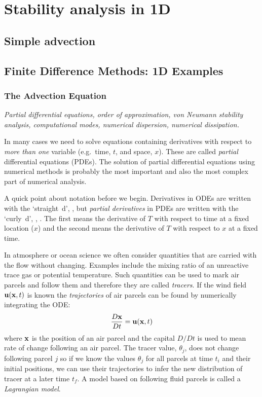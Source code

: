 
\appendix
\chapter{Stability analysis in 1D}

\section{Simple advection}

\section{Finite Difference Methods: 1D Examples}
\subsection{The Advection Equation}
\textsl{Partial differential equations, order of approximation, von
	Neumann stability analysis, computational modes, numerical
	dispersion, numerical dissipation.}

In many cases we need to solve equations containing
derivatives with respect to \emph{more than one} variable (e.g.~time,
$t$, and space, $x$).  These are called \emph{partial} differential
equations (PDEs). The solution of partial differential equations using
numerical methods is probably the most important and also the most
complex part of numerical analysis.

A quick point about notation before we begin.  Derivatives in ODEs are
written with the `straight~d',
\BEQ {}  \;\;\; , \EEQ
but {\em partial derivatives} in PDEs are written with the `curly~d',
\BEQ {} \;\;\; , \;\;\;  . \EEQ
The first means the derivative of $T$ with respect to time at a fixed
location ($x$) and the second means the derivative of $T$ with respect
to $x$ at a fixed time.

In atmosphere or ocean science we often consider quantities that are
carried with the flow without changing. Examples include the mixing
ratio of an unreactive trace gas or potential temperature. Such
quantities can be used to mark air parcels and follow them and
therefore they are called {\em tracers}. If the wind field ${\bf
	u}({\bf x}, t)$ is known the {\em trajectories} of air parcels can be
found by numerically integrating the ODE:
\begin{equation}
	\frac{D{\bf x}}{Dt}={\bf u}({\bf x}, t)
\end{equation}
where ${\bf x}$ is the position of an air parcel and the capital
$D/Dt$ is used to mean rate of change following an air parcel. 
The tracer value, $\theta_j$, does not change following parcel $j$ so
if we know the values $\theta_j$ for all parcels at time $t_i$ and
their initial positions, we can use their trajectories
to infer the new distribution of tracer at a later time $t_f$. A model
based on following fluid parcels is called a {\em Lagrangian model}.

